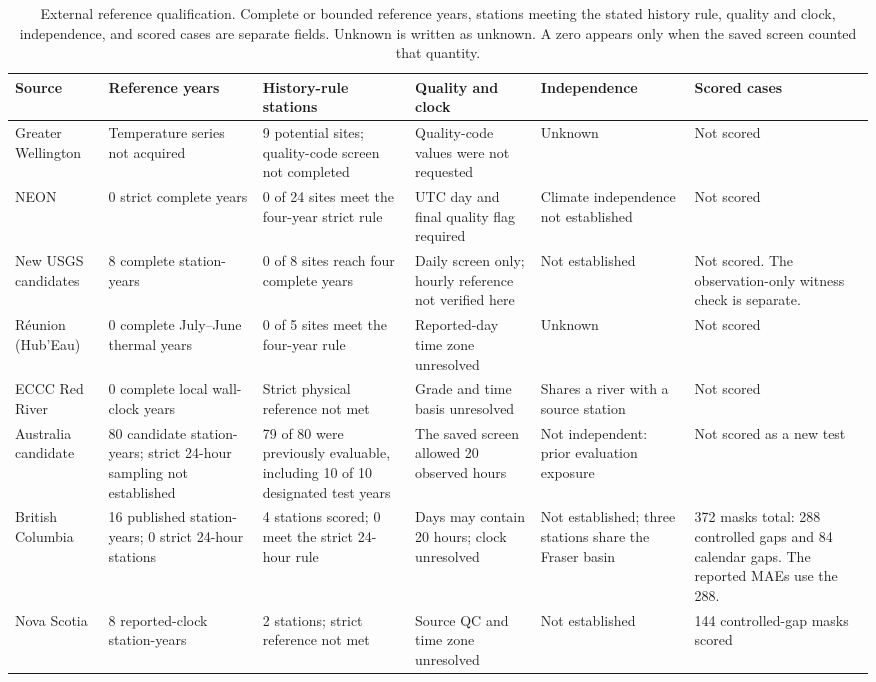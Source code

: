 \begin{table}[p]
\centering
\scriptsize
\setlength{\tabcolsep}{3pt}
\renewcommand{\arraystretch}{1.08}
\caption{External reference qualification. Complete or bounded reference years, stations meeting the stated history rule, quality and clock, independence, and scored cases are separate fields. Unknown is written as unknown. A zero appears only when the saved screen counted that quantity.}
\label{tab:external-qualification}
\begin{tabular}{@{}p{}p{}p{}p{}p{}p{}@{}}
\toprule
Source & Reference years & History-rule stations & Quality and clock & Independence & Scored cases \\
\midrule
Greater Wellington & Temperature series not acquired & 9 potential sites; quality-code screen not completed & Quality-code values were not requested & Unknown & Not scored \\
NEON & 0 strict complete years & 0 of 24 sites meet the four-year strict rule & UTC day and final quality flag required & Climate independence not established & Not scored \\
New USGS candidates & 8 complete station-years & 0 of 8 sites reach four complete years & Daily screen only; hourly reference not verified here & Not established & Not scored. The observation-only witness check is separate. \\
R\'eunion (Hub'Eau) & 0 complete July--June thermal years & 0 of 5 sites meet the four-year rule & Reported-day time zone unresolved & Unknown & Not scored \\
ECCC Red River & 0 complete local wall-clock years & Strict physical reference not met & Grade and time basis unresolved & Shares a river with a source station & Not scored \\
Australia candidate & 80 candidate station-years; strict 24-hour sampling not established & 79 of 80 were previously evaluable, including 10 of 10 designated test years & The saved screen allowed 20 observed hours & Not independent: prior evaluation exposure & Not scored as a new test \\
British Columbia & 16 published station-years; 0 strict 24-hour stations & 4 stations scored; 0 meet the strict 24-hour rule & Days may contain 20 hours; clock unresolved & Not established; three stations share the Fraser basin & 372 masks total: 288 controlled gaps and 84 calendar gaps. The reported MAEs use the 288. \\
Nova Scotia & 8 reported-clock station-years & 2 stations; strict reference not met & Source QC and time zone unresolved & Not established & 144 controlled-gap masks scored \\

\end{tabular}
\end{table}
